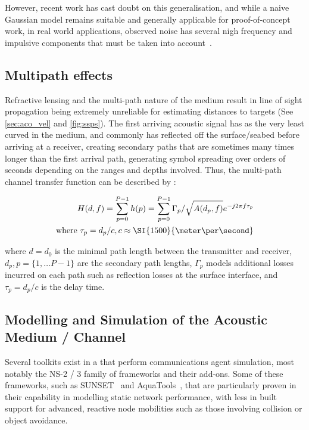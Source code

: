 However, recent work has cast doubt on this generalisation, and while a naive Gaussian model remains suitable and generally applicable for proof-of-concept work,  in real world applications, observed noise has several nigh frequency and impulsive components that must be taken into account~\cite{Mahmood2016, Deane2016}. 

\subsection{Multipath effects}

Refractive lensing and the multi-path nature of the medium result in line of sight propagation being extremely unreliable for estimating distances to targets (See \autoref{sec:aco_vel} and \autoref{fig:ssps}).
The first arriving acoustic signal has as the very least curved in the medium, and commonly has reflected off the surface/seabed before arriving at a receiver, creating secondary paths that are sometimes many times longer than the first arrival path, generating symbol spreading over orders of seconds depending on the ranges and depths involved.
Thus, the multi-path channel transfer function can be described by :

\begin{align}
  \label{eq:acomultipath}
  H(d,f) =\sum_{p=0}^{P-1} h(p) = \sum_{p=0}^{P-1} \Gamma_p / \sqrt{A(d_p,f)}e^{-j 2 \pi f \tau_p} \\
  \text{where } \tau_p = d_p/c, c \approx \SI{1500}{\meter\per\second} \notag
\end{align}

where $d=d_0$ is the minimal path length between the transmitter and receiver, $d_p,p=\{1,\dots P-1\}$ are the secondary path lengths, $\Gamma_p$ models additional losses incurred on each path such as reflection losses at the surface interface, and $\tau_p = d_p/c$ is the delay time.


\subsection{Modelling and Simulation of the Acoustic Medium / Channel}\label{sec:modelling-and-simulation-of-the-acoustic-medium-/-channel}

Several toolkits exist in a that perform communications agent simulation, most notably the NS-2 / 3 family of frameworks and their add-ons.
Some of these frameworks, such as SUNSET~\cite{Petrioli2012a} and AquaTools~\cite{Sehgal2010}, that are particularly proven in their capability in modelling static network performance, with less in built support for advanced, reactive node mobilities such as those involving collision or object avoidance.

